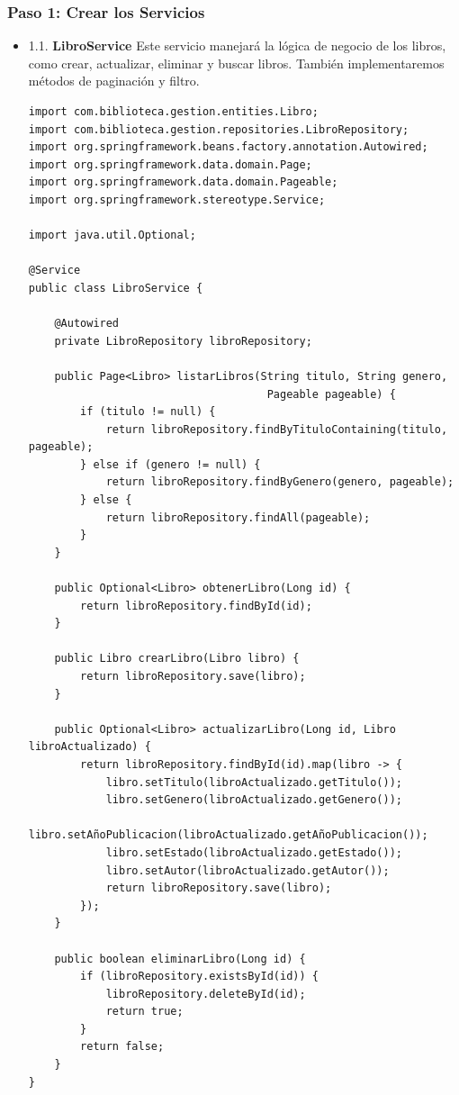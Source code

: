 \documentclass[11pt]{article}
\begin{document}
\subsubsection{Paso 1: Crear los Servicios}
\label{sec:org16e4d3e}
\begin{itemize}
\item 1.1. \textbf{LibroService}
\label{sec:org3e8b7e3}
Este servicio manejará la lógica de negocio de los libros, como crear,
actualizar, eliminar y buscar libros. También implementaremos métodos de
paginación y filtro.

\begin{verbatim}
import com.biblioteca.gestion.entities.Libro;
import com.biblioteca.gestion.repositories.LibroRepository;
import org.springframework.beans.factory.annotation.Autowired;
import org.springframework.data.domain.Page;
import org.springframework.data.domain.Pageable;
import org.springframework.stereotype.Service;

import java.util.Optional;

@Service
public class LibroService {

    @Autowired
    private LibroRepository libroRepository;

    public Page<Libro> listarLibros(String titulo, String genero,
                                     Pageable pageable) {
        if (titulo != null) {
            return libroRepository.findByTituloContaining(titulo, pageable);
        } else if (genero != null) {
            return libroRepository.findByGenero(genero, pageable);
        } else {
            return libroRepository.findAll(pageable);
        }
    }

    public Optional<Libro> obtenerLibro(Long id) {
        return libroRepository.findById(id);
    }

    public Libro crearLibro(Libro libro) {
        return libroRepository.save(libro);
    }

    public Optional<Libro> actualizarLibro(Long id, Libro libroActualizado) {
        return libroRepository.findById(id).map(libro -> {
            libro.setTitulo(libroActualizado.getTitulo());
            libro.setGenero(libroActualizado.getGenero());
            libro.setAñoPublicacion(libroActualizado.getAñoPublicacion());
            libro.setEstado(libroActualizado.getEstado());
            libro.setAutor(libroActualizado.getAutor());
            return libroRepository.save(libro);
        });
    }

    public boolean eliminarLibro(Long id) {
        if (libroRepository.existsById(id)) {
            libroRepository.deleteById(id);
            return true;
        }
        return false;
    }
}
\end{verbatim}


\end{itemize}
\end{document}
